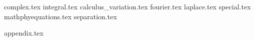 \documentclass[
]{ctexbook}
\begin{document}


% 
% 

\setcounter{secnumdepth}{4}
\setcounter{tocdepth}{4}
\tableofcontents
% 


% 
% 

% 
% 
% 

{complex.tex}
{integral.tex}
{calculus_variation.tex}
{fourier.tex}
{laplace.tex}
{special.tex}
{mathphyequations.tex}
{separation.tex}



{appendix.tex}
\end{document}
